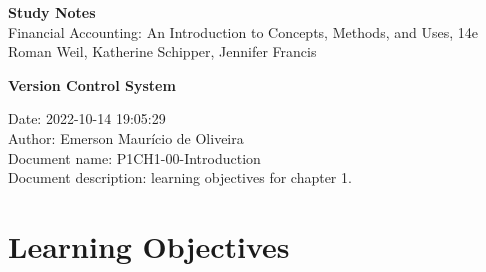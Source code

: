 \documentclass{article}\usepackage[]{graphicx}\usepackage[]{xcolor}
\begin{document}
\setlength{\abovedisplayskip}{0pt}
\setlength{\belowdisplayskip}{0pt}
\setlength{\abovedisplayshortskip}{0pt}
\setlength{\belowdisplayshortskip}{0pt}



\begin{center}
\LARGE
\textbf{Study Notes}\\
\vspace{0.5 cm}
\large
Financial Accounting: An Introduction to Concepts, Methods, and Uses, 14e\\
Roman Weil, Katherine Schipper, Jennifer Francis
\end{center}

\vspace{0.5 cm}

\textbf{Version Control System}\par

Date: 2022-10-14 19:05:29\\
Author: Emerson Maurício de Oliveira\\
Document name: P1CH1-00-Introduction\\
Document description: learning objectives for chapter 1.\par

\section*{Learning Objectives}




























\end{document}
